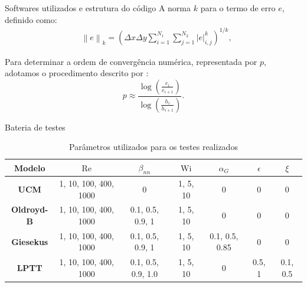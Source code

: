\begin{frame}{Softwares utilizados e estrutura do código}
A norma $k$ para o termo de erro $e$, definido como:
\begin{align}
    &\left \|e\right \|_{k}=\left(\Delta x \Delta y \sum_{i=1}^{N_{1}}\sum_{j=1}^{N_{2}} \left |e\right |_{i,j}^{k}\right)^{1/k}, \label{norm_k}
\end{align}

Para determinar a ordem de convergência numérica, representada por $p$, adotamos o procedimento descrito por \cite{leveque2007finite}:
\begin{equation}\label{log_p} 
    p \approx \frac{\log\left(\frac{e_{i}}{e_{i+1}}\right)}{\log\left(\frac{h_{i}}{h_{i+1}}\right)}. 
\end{equation}
\end{frame}

\begin{frame}{Bateria de testes}
\begin{table}[h]
    \caption{Parâmetros utilizados para os testes realizados}\label{tab_test_cases}
    \begin{tabular}{c|cccccc}
        \toprule
        \textbf{Modelo} & $\operatorname{Re}$ & $\beta_{nn}$ & $\operatorname{Wi}$ & $\alpha_{G}$ & $\epsilon$ & $\xi$ \\ \midrule
        \textbf{UCM} & 1, 10, 100, 400, 1000 & 0 & 1, 5, 10 & 0 & 0 & 0 \\ \midrule
        \textbf{Oldroyd-B} & 1, 10, 100, 400, 1000 & 0.1, 0.5, 0.9, 1 & 1, 5, 10 & 0 & 0 & 0 \\ \midrule
        \textbf{Giesekus} & 1, 10, 100, 400, 1000 & 0.1, 0.5, 0.9, 1 & 1, 5, 10 & 0.1, 0.5, 0.85 & 0 & 0 \\ \midrule
        \textbf{LPTT} & 1, 10, 100, 400, 1000 & 0.1, 0.5, 0.9, 1.0 & 1, 5, 10 & 0 & 0.5, 1 & 0.1, 0.5 \\ \bottomrule
    \end{tabular}
\end{table}
\end{frame}

